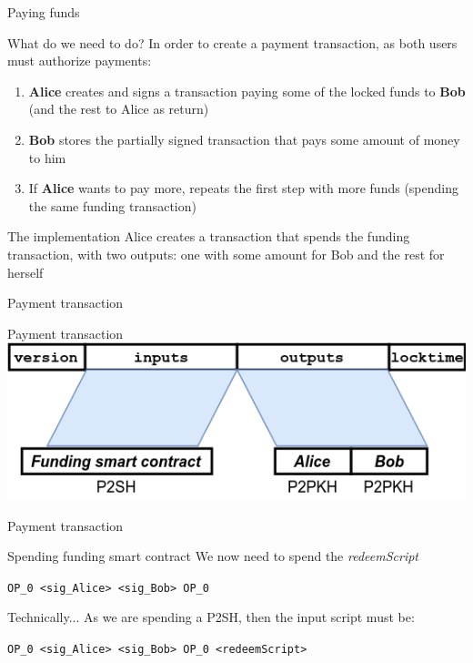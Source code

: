 \documentclass{beamer}
\begin{document}
\begin{frame}{Paying funds}
 \begin{block}{What do we need to do?}
  In order to create a payment transaction, as both users must authorize payments:
  \begin{enumerate}
   \item \textbf{Alice} creates and signs a transaction paying some of the locked funds to \textbf{Bob} (and the rest to Alice as return)
   \item \textbf{Bob} stores the partially signed transaction that pays some amount of money to him
   \item If \textbf{Alice} wants to pay more, repeats the first step with more funds (spending the same funding transaction)
  \end{enumerate}
 \end{block}
 \pause
 \begin{block}{The implementation}
  Alice creates a transaction that spends the funding transaction, with two outputs: one with some amount for Bob and the rest for herself
 \end{block}
\end{frame}
\begin{frame}{Payment transaction}
 \begin{exampleblock}{Payment transaction}
  \includegraphics[width=\textwidth, height=0.8\textheight, keepaspectratio]{img/unidir_tx_payment.png}
 \end{exampleblock}
\end{frame}
\begin{frame}{Payment transaction}
 \begin{exampleblock}{Spending funding smart contract}
  We now need to spend the \textit{redeemScript}
  \pause
  \begin{center}
   \texttt{OP\_0 <sig\_Alice> <sig\_Bob> OP\_0}
  \end{center}
 \end{exampleblock}
 \begin{exampleblock}{Technically...}
  As we are spending a P2SH, then the input script must be:\
  \begin{center}
   \texttt{OP\_0 <sig\_Alice> <sig\_Bob> OP\_0 <redeemScript>}
  \end{center}

 \end{exampleblock}
\end{frame}
\end{document}
